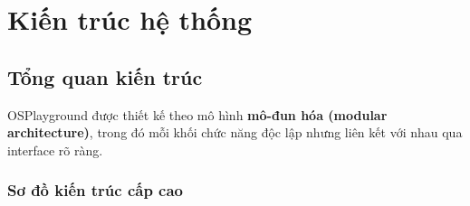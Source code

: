 
\chapter{Kiến trúc hệ thống}
\label{ch:architecture}

\section{Tổng quan kiến trúc}

OSPlayground được thiết kế theo mô hình \textbf{mô-đun hóa (modular architecture)}, 
trong đó mỗi khối chức năng độc lập nhưng liên kết với nhau qua interface rõ ràng.

\subsection{Sơ đồ kiến trúc cấp cao}

